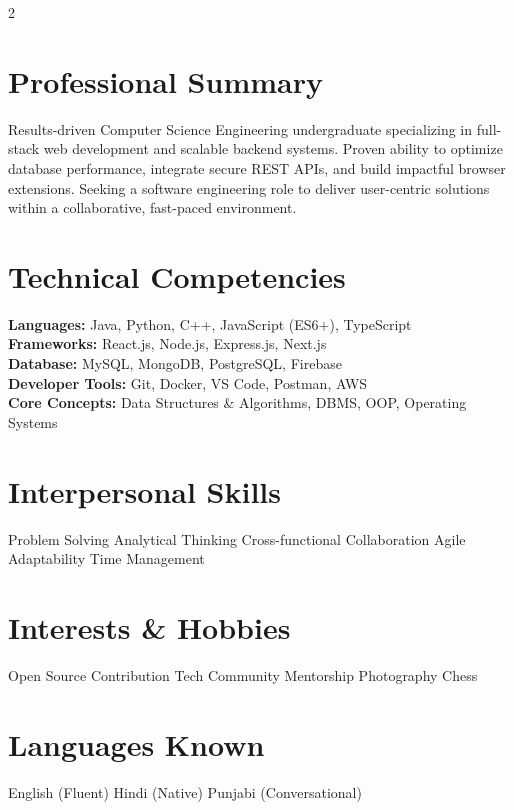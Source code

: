 \documentclass[10pt,a4paper]{article}
\begin{document}
\begin{paracol}{2}
\section*{Professional Summary}
Results-driven Computer Science Engineering undergraduate specializing in full-stack web development and scalable backend systems. Proven ability to optimize database performance, integrate secure REST APIs, and build impactful browser extensions. Seeking a software engineering role to deliver user-centric solutions within a collaborative, fast-paced environment.

\section*{Technical Competencies}
\textbf{Languages:} Java, Python, C++, JavaScript (ES6+), TypeScript\\[4pt]
\textbf{Frameworks:} React.js, Node.js, Express.js, Next.js\\[4pt]
\textbf{Database:} MySQL, MongoDB, PostgreSQL, Firebase\\[4pt]
\textbf{Developer Tools:} Git, Docker, VS Code, Postman, AWS\\[4pt]
\textbf{Core Concepts:} Data Structures \& Algorithms, DBMS, OOP, Operating Systems

\section*{Interpersonal Skills}
Problem Solving \textbar{} Analytical Thinking \textbar{} Cross-functional Collaboration \textbar{} Agile Adaptability \textbar{} Time Management

\section*{Interests \& Hobbies}
Open Source Contribution \textbar{} Tech Community Mentorship \textbar{} Photography \textbar{} Chess

\section*{Languages Known}
English (Fluent) \textbar{} Hindi (Native) \textbar{} Punjabi (Conversational)

\switchcolumn

\vspace*{0pt}
\raggedright


\end{paracol}
\end{document}
